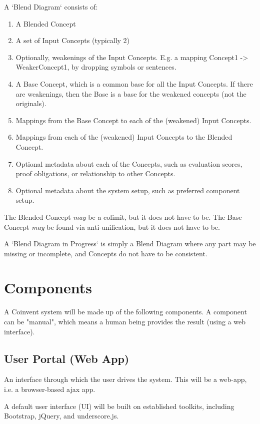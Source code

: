 \documentclass[10pt]{article}
\begin{document}
A `Blend Diagram` consists of:
\begin{enumerate}
\item A Blended Concept
\item A set of Input Concepts (typically 2)
\item Optionally, weakenings of the Input Concepts. E.g. a mapping Concept1 -> WeakerConcept1, by dropping symbols or sentences.
\item A Base Concept, which is a common base for all the Input Concepts. If there are weakenings, then the Base is a base for the weakened concepts (not the originals).
\item Mappings from the Base Concept to each of the (weakened) Input Concepts.
\item Mappings from each of the (weakened) Input Concepts to the Blended Concept.
\item Optional metadata about each of the Concepts, such as evaluation scores,  proof obligations, or relationship to other Concepts.
\item Optional metadata about the system setup, such as preferred component setup.
\end{enumerate}

The Blended Concept {\em may} be a colimit, but it does not have to be.
The Base Concept {\em may} be found via anti-unification, but it does not have to be.

A `Blend Diagram in Progress` is simply a Blend Diagram where any part may be missing or incomplete, and Concepts do not have to be consistent. 

\section{Components}\label{sec:components}

A Coinvent system will be made up of the following components.
A component can be "manual", which means a human being provides the result (using a web interface).

\subsection{User Portal (Web App)}\label{sec:userportal}
An interface through which the user drives the system. This will be a web-app,
i.e. a browser-based ajax app.

A default user interface (UI) will be built on established toolkits, including Bootstrap, jQuery, and underscore.js.
\end{document}
